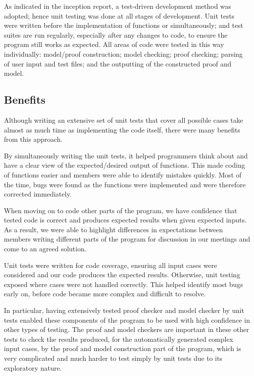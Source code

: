 As indicated in the inception report, a test-driven development method was adopted; hence unit testing was done at all stages of development. Unit tests were written before the implementation of functions or simultaneously; and test suites are run regularly, especially after any changes to code, to ensure the program still works as expected. All areas of code were tested in this way individually: model/proof construction; model checking; proof checking; parsing of user input and test files; and the outputting of the constructed proof and model.

\subsection*{Benefits}
Although writing an extensive set of unit tests that cover all possible cases take almost as much time as implementing the code itself, there were many benefits from this approach.

By simultaneously writing the unit tests, it helped programmers think about and have a clear view of the expected/desired output of functions. This made coding of functions easier and members were able to identify mistakes quickly. Most of the time, bugs were found as the functions were implemented and were therefore corrected immediately.

When moving on to code other parts of the program, we have confidence that tested code is correct and produces expected results when given expected inputs. As a result, we were able to highlight differences in expectations between members writing different parts of the program for discussion in our meetings and come to an agreed solution.

Unit tests were written for code coverage, ensuring all input cases were considered and our code produces the expected results. Otherwise, unit testing exposed where cases were not handled correctly. This helped identify most bugs early on, before code became more complex and difficult to resolve.

In particular, having extensively tested proof checker and model checker by unit tests enabled these components of the program to be used with high confidence in other types of testing. The proof and model checkers are important in these other tests to check the results produced, for the automatically generated complex input cases, by the proof and model construction part of the program, which is very complicated and much harder to test simply by unit tests due to its exploratory nature.

